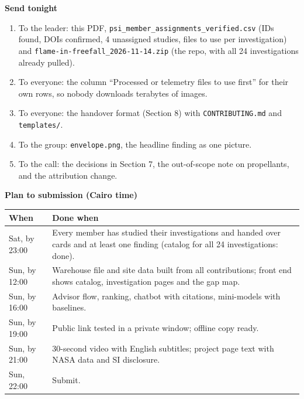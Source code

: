 \documentclass[10pt,a4paper]{article}
\newcommand{\file}[1]{\nolinkurl{#1}}
\begin{document}
\textbf{Send tonight}\par
\begin{enumerate}
\item To the leader: this PDF, \file{psi_member_assignments_verified.csv} (IDs found, DOIs confirmed, 4 unassigned studies, files to use per investigation) and \file{flame-in-freefall_2026-11-14.zip} (the repo, with all 24 investigations already pulled).
\item To everyone: the column ``Processed or telemetry files to use first'' for their own rows, so nobody downloads terabytes of images.
\item To everyone: the handover format (Section 8) with \file{CONTRIBUTING.md} and \file{templates/}.
\item To the group: \file{envelope.png}, the headline finding as one picture.
\item To the call: the decisions in Section 7, the out-of-scope note on propellants, and the attribution change.
\end{enumerate}

\textbf{Plan to submission (Cairo time)}\par\smallskip
\begin{tabularx}{\linewidth}{@{}p{3.2cm}L@{}}
\toprule
\textbf{When} & \textbf{Done when}\\
\midrule
Sat, by 23:00 & Every member has studied their investigations and handed over cards and at least one finding (catalog for all 24 investigations: done).\\
Sun, by 12:00 & Warehouse file and site data built from all contributions; front end shows catalog, investigation pages and the gap map.\\
Sun, by 16:00 & Advisor flow, ranking, chatbot with citations, mini-models with baselines.\\
Sun, by 19:00 & Public link tested in a private window; offline copy ready.\\
Sun, by 21:00 & 30-second video with English subtitles; project page text with NASA data and SI disclosure.\\
Sun, 22:00 & Submit.\\
\bottomrule
\end{tabularx}

\appendix
\end{document}
